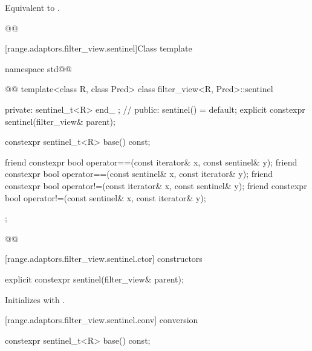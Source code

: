 \begin{itemdescr}
\pnum
\effects Equivalent to .

\pnum
{}
\begin{codeblock}
@@
\end{codeblock}
\end{itemdescr}

[range.adaptors.filter_view.sentinel]{Class template }

%
\begin{codeblock}
namespace std@@ { @@
  template<class R, class Pred>
  class filter_view<R, Pred>::sentinel {
  private:
    sentinel_t<R> end_ {}; // \expos
  public:
    sentinel() = default;
    explicit constexpr sentinel(filter_view& parent);

    constexpr sentinel_t<R> base() const;

    friend constexpr bool operator==(const iterator& x, const sentinel& y);
    friend constexpr bool operator==(const sentinel& x, const iterator& y);
    friend constexpr bool operator!=(const iterator& x, const sentinel& y);
    friend constexpr bool operator!=(const sentinel& x, const iterator& y);
  };
}@\oldtxt{\}}@
\end{codeblock}

[range.adaptors.filter_view.sentinel.ctor]{ constructors}

%
\begin{itemdecl}
explicit constexpr sentinel(filter_view& parent);
\end{itemdecl}

\begin{itemdescr}
\pnum
\effects Initializes  with .
\end{itemdescr}

[range.adaptors.filter_view.sentinel.conv]{ conversion}

%
\begin{itemdecl}
constexpr sentinel_t<R> base() const;
\end{itemdecl}

